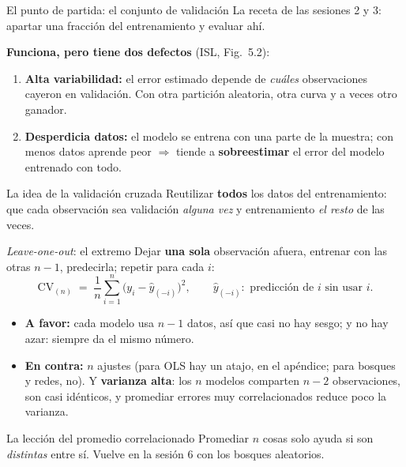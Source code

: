 \documentclass{beamer}
\newcommand{\1}{\mathbb{I}}
\begin{document}
\begin{frame}{El punto de partida: el conjunto de validación}
\small
La receta de las sesiones 2 y 3: apartar una fracción del entrenamiento y evaluar ahí.
\vspace{0.1cm}
\begin{center}
\end{center}
\pause
\textbf{Funciona, pero tiene dos defectos} (ISL, Fig.~5.2):
\begin{enumerate}\itemsep4pt
  \item \textbf{Alta variabilidad:} el error estimado depende de \emph{cuáles} observaciones cayeron en validación. Con otra partición aleatoria, otra curva y a veces otro ganador.
  \item \textbf{Desperdicia datos:} el modelo se entrena con una parte de la muestra; con menos datos aprende peor $\Rightarrow$ tiende a \textbf{sobreestimar} el error del modelo entrenado con todo.
\end{enumerate}
\pause
\vspace{0.1cm}
\begin{block}{La idea de la validación cruzada}
Reutilizar \textbf{todos} los datos del entrenamiento: que cada observación sea validación \emph{alguna vez} y entrenamiento \emph{el resto} de las veces.
\end{block}
\end{frame}

\begin{frame}{\emph{Leave-one-out}: el extremo}
\small
Dejar \textbf{una sola} observación afuera, entrenar con las otras $n-1$, predecirla; repetir para cada $i$:
\[ \mathrm{CV}_{(n)} \;=\; \frac{1}{n} \sum_{i=1}^{n} \big( y_i - \hat{y}_{(-i)} \big)^2, \qquad \hat{y}_{(-i)}: \text{ predicción de } i \text{ sin usar } i. \]
\pause
\begin{itemize}\itemsep4pt
  \item \textbf{A favor:} cada modelo usa $n-1$ datos, así que casi no hay sesgo; y no hay azar: siempre da el mismo número.
  \item \textbf{En contra:} $n$ ajustes (para OLS hay un atajo, en el apéndice; para bosques y redes, no). Y \textbf{varianza alta}: los $n$ modelos comparten $n-2$ observaciones, son casi idénticos, y promediar errores muy correlacionados reduce poco la varianza. \pause
\end{itemize}
\vspace{0.1cm}
\begin{block}{La lección del promedio correlacionado}
Promediar $n$ cosas solo ayuda si son \emph{distintas} entre sí. Vuelve en la sesión 6 con los bosques aleatorios.
\end{block}
\end{frame}
\end{document}
